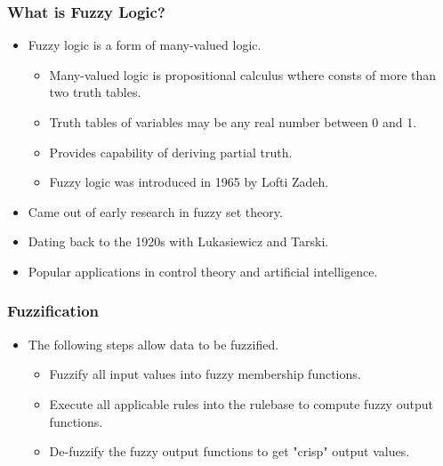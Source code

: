 \documentclass{beamer}
\begin{document}
   \begin{frame}
      \frametitle{What is Fuzzy Logic?}
      \begin{itemize}
         \item Fuzzy logic is a form of many-valued logic.
         \begin{itemize}
            \item Many-valued logic is propositional calculus wthere consts of more than two truth tables.
            \item Truth tables of variables may be any real number between 0 and 1.
            \item Provides capability of deriving partial truth.
            \item Fuzzy logic was introduced in 1965 by Lofti Zadeh.
         \end{itemize}
         \item Came out of early research in fuzzy set theory.
         \item Dating back to the 1920s with Lukasiewicz and Tarski.
         \item Popular applications in control theory and artificial intelligence.
      \end{itemize}
   \end{frame}

   \begin{frame}
      \frametitle{Fuzzification}
      \begin{itemize}
         \item The following steps allow data to be fuzzified.
         \begin{itemize}
            \item Fuzzify all input values into fuzzy membership functions.
            \item Execute all applicable rules into the rulebase to compute fuzzy output functions.
            \item De-fuzzify the fuzzy output functions to get "crisp" output values.
         \end{itemize}
      \end{itemize}
   \end{frame}
\end{document}
